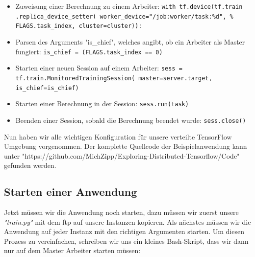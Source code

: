\begin{itemize}
	\item Zuweisung einer Berechnung zu einem Arbeiter: \newline
		\texttt{with tf.device(tf.train \newline
			\hspace*{5mm} .replica\_device\_setter(
			\hspace*{5mm} worker\_device="/job:worker/task:\%d",\newline
			\hspace*{5mm} \% FLAGS.task\_index, cluster=cluster)):}
	\item Parsen des Arguments "is\_chief", welches angibt, ob ein Arbeiter als Master fungiert: \newline
		\texttt{is\_chief = (FLAGS.task\_index == 0)}
	\item Starten einer neuen Session auf einem Arbeiter: \newline
		\texttt{sess = tf.train.MonitoredTrainingSession(
			master=server.target,
			is\_chief=is\_chief)}
	\item Starten einer Berechnung in der Session: \newline
		\texttt{sess.run(task)}
	\item Beenden einer Session, sobald die Berechnung beendet wurde: \newline
		\texttt{sess.close()}
\end{itemize}

Nun haben wir alle wichtigen Konfiguration für unsere verteilte TensorFlow Umgebung vorgenommen. Der komplette Quellcode der Beispielanwendung kann unter "https://github.com/MichZipp/Exploring-Distributed-Tensorflow/Code" gefunden werden. 

\subsection{Starten einer Anwendung}
Jetzt müssen wir die Anwendung noch starten, dazu müssen wir zuerst unsere \textit{"train.py"} mit dem \ac{ftp} auf unsere Instanzen kopieren. Als nächstes müssen wir die Anwendung auf jeder Instanz mit den richtigen Argumenten starten. Um diesen Prozess zu vereinfachen, schreiben wir uns ein kleines Bash-Skript, dass wir dann nur auf dem Master Arbeiter starten müssen:


